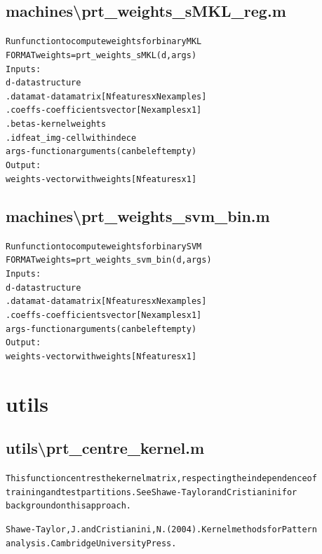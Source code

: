 \subsection{machines\textbackslash prt\_weights\_sMKL\_reg.m}
\begin{alltt}

 Run function to compute weights for binary MKL
 FORMAT weights = prt\_weights\_sMKL (d,args)
 Inputs:
       d               - data structure
           .datamat    - data matrix [Nfeatures x Nexamples]
           .coeffs     - coefficients vector [Nexamples x 1]
           .betas      - kernel weights
           .idfeat\_img - cell with indece
       args            - function arguments (can be left empty)
 Output:
       weights         - vector with weights [Nfeatures x 1]
\end{alltt}


\subsection{machines\textbackslash prt\_weights\_svm\_bin.m}
\begin{alltt}

 Run function to compute weights for binary SVM
 FORMAT weights = prt\_weights\_svm\_bin (d,args)
 Inputs:
       d              - data structure
           .datamat   - data matrix [Nfeatures x Nexamples]
           .coeffs    - coefficients vector [Nexamples x 1]
       args           - function arguments (can be left empty)
 Output:
       weights        - vector with weights [Nfeatures x 1]
\end{alltt}


\section{utils}

\subsection{utils\textbackslash prt\_centre\_kernel.m}
\begin{alltt}

 This function centres the kernel matrix, respecting the independence of
 training and test partitions. See Shawe-Taylor and Cristianini for
 background on this approach.
 
 Shawe-Taylor, J. and Cristianini, N. (2004). Kernel methods for Pattern
 analysis. Cambridge University Press.
\end{alltt}


